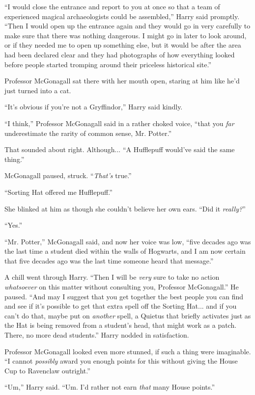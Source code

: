 ``I would close the entrance and report to you at once so that a team of experienced magical archaeologists could be assembled,'' Harry said promptly. ``Then I would open up the entrance again and they would go in very carefully to make sure that there was nothing dangerous. I might go in later to look around, or if they needed me to open up something else, but it would be after the area had been declared clear and they had photographs of how everything looked before people started tromping around their priceless historical site.''

Professor McGonagall sat there with her mouth open, staring at him like he'd just turned into a cat.

``It's obvious if you're not a Gryffindor,'' Harry said kindly.

``I think,'' Professor McGonagall said in a rather choked voice, ``that you \emph{far} underestimate the rarity of common sense, Mr. Potter.''

That sounded about right. Although... ``A Hufflepuff would've said the same thing.''

McGonagall paused, struck. ``\emph{That's} true.''

``Sorting Hat offered me Hufflepuff.''

She blinked at him as though she couldn't believe her own ears. ``Did it \emph{really?}''

``Yes.''

``Mr. Potter,'' McGonagall said, and now her voice was low, ``five decades ago was the last time a student died within the walls of Hogwarts, and I am now certain that five decades ago was the last time someone heard that message.''

A chill went through Harry. ``Then I will be \emph{very} sure to take no action \emph{whatsoever} on this matter without consulting you, Professor McGonagall.'' He paused. ``And may I suggest that you get together the best people you can find and see if it's possible to get that extra spell off the Sorting Hat... and if you can't do that, maybe put on \emph{another} spell, a Quietus that briefly activates just as the Hat is being removed from a student's head, that might work as a patch. There, no more dead students.'' Harry nodded in satisfaction.

Professor McGonagall looked even more stunned, if such a thing were imaginable. ``I cannot \emph{possibly} award you enough points for this without giving the House Cup to Ravenclaw outright.''

``Um,'' Harry said. ``Um. I'd rather not earn \emph{that} many House points.''

